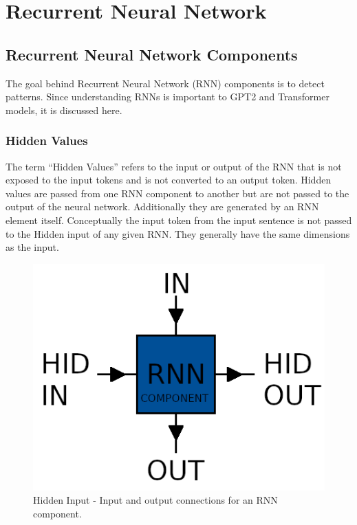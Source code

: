 \chapter{Recurrent Neural Network}

\label{chapter-recurrent}

\section{Recurrent Neural Network Components}

The goal behind Recurrent Neural Network (RNN) components is to detect patterns. Since understanding RNNs is important to GPT2 and Transformer models, it is discussed here. 

\subsection{Hidden Values}
The term ``Hidden Values'' refers to the input or output of the RNN that is not exposed to the input tokens and is not converted to an output token. Hidden values are passed from one RNN component to another but are not passed to the output of the neural network. Additionally they are generated by an RNN element itself. Conceptually the input token from the input sentence is not passed to the Hidden input of any given RNN. They generally have the same dimensions as the input.

\begin{figure}[H]
	\begin{center}
		
		\includegraphics[scale=2.0]{diagram-hidden}
		
	\end{center}
	\caption[Hidden Input]{Hidden Input - Input and output connections for an RNN component.}
	\label{diagram-hidden}
	
\end{figure}


